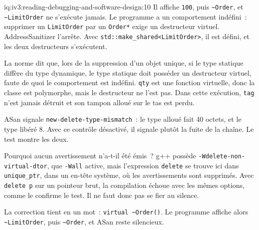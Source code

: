 \begin{solution}{iq:iv3:reading-debugging-and-software-design:10}
Il affiche \texttt{100}, puis \texttt{\textasciitilde{}Order}, et \texttt{\textasciitilde{}LimitOrder} ne s'exécute jamais. Le programme a un comportement indéfini~: supprimer un \texttt{LimitOrder} par un \texttt{Order*} exige un destructeur virtuel. AddressSanitizer l'arrête. Avec \texttt{std::make\_shared<LimitOrder>}, il est défini, et les deux destructeurs s'exécutent.

La norme dit que, lors de la suppression d'un objet unique, si le type statique diffère du type dynamique, le type statique doit posséder un destructeur virtuel, faute de quoi le comportement est indéfini. \texttt{qty} est une fonction virtuelle, donc la classe est polymorphe, mais le destructeur ne l'est pas. Dans cette exécution, \texttt{tag} n'est jamais détruit et son tampon alloué sur le tas est perdu.

ASan signale \texttt{new-delete-type-mismatch}~: le type alloué fait 40 octets, et le type libéré 8. Avec ce contrôle désactivé, il signale plutôt la fuite de la chaîne. Le test montre les deux.

Pourquoi aucun avertissement n'a-t-il été émis~? g++ possède \texttt{-Wdelete-non-virtual-dtor}, que \texttt{-Wall} active, mais l'expression \texttt{delete} se trouve ici dans \texttt{unique\_ptr}, dans un en-tête système, où les avertissements sont supprimés. Avec \texttt{delete p} sur un pointeur brut, la compilation échoue avec les mêmes options, comme le confirme le test. Il ne faut donc pas se fier au silence.

La correction tient en un mot~: \texttt{virtual \textasciitilde{}Order()}. Le programme affiche alors \texttt{\textasciitilde{}LimitOrder}, puis \texttt{\textasciitilde{}Order}, et ASan reste silencieux.


\end{solution}

